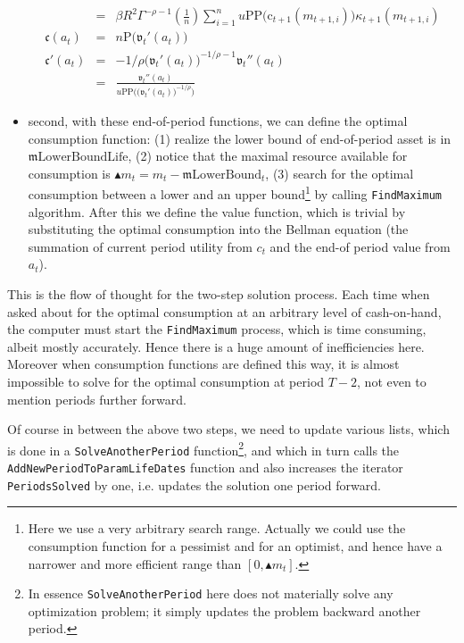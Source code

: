 \documentclass[titlepage,abstract]{\econtex}
\providecommand{\mEndLowerBoundLife}{\ensuremath{\mathfrak{m}}\text{LowerBoundLife}}
\providecommand{\mEndLowerBound}{\ensuremath{\mathfrak{m}}\text{LowerBound}}
\begin{document}
\begin{itemize}
\begin{eqnarray}
            &=& \beta R^{2} \Gamma^{-\rho-1} \left(\frac{1}{n}\right)\sum_{i=1}^{n}
              u\text{PP}\big(\ensuremath{\mathrm{c}}_{t+1}(m_{t+1, i})\big) \ensuremath{\kappa}_{t+1}(m_{t+1, i}) \\
              \ensuremath{\mathfrak{c}}(a_{t}) &=& n\text{P}\big(\ensuremath{\mathfrak{v}}_{t}'(a_{t})\big) \\
              \ensuremath{\mathfrak{c}}'(a_{t}) &=&-1/\rho \big(\ensuremath{\mathfrak{v}}_{t}'(a_{t})\big)^{-1/\rho-1} \ensuremath{\mathfrak{v}}_{t}''(a_{t}) \\
              &=& \frac{\ensuremath{\mathfrak{v}}_{t}''(a_{t})}{u\text{PP}\Big(\big(\ensuremath{\mathfrak{v}}_{t}'(a_{t})\big)^{-1/\rho}\Big)}
            \end{eqnarray}
      \item second, with these end-of-period functions, we can define the optimal consumption function: (1) realize the lower bound of end-of-period asset is in $\mEndLowerBoundLife$, (2) notice that the maximal resource available for consumption is $\blacktriangle m_{t}=m_{t}- \mEndLowerBound_{t}$, (3) search for the optimal consumption between a lower and an upper bound\footnote{Here we use a very arbitrary search range. Actually we could use the consumption function for a pessimist and for an optimist, and hence have a narrower and more efficient range than $[0, \blacktriangle m_{t}]$.} by calling \texttt{FindMaximum} algorithm. After this we define the value function, which is trivial by substituting the optimal consumption into the Bellman equation (the summation of current period utility from $c_{t}$ and the end-of period value from $a_{t}$).
\end{itemize}

This is the flow of thought for the two-step solution process. Each time when asked about for the optimal consumption at an arbitrary level of cash-on-hand, the computer must start the \texttt{FindMaximum} process, which is time consuming, albeit mostly accurately. Hence there is a huge amount of inefficiencies here. Moreover when consumption functions are defined this way, it is almost impossible to solve for the optimal consumption at period $T-2$, not even to mention periods further forward.

Of course in between the above two steps, we need to update various lists, which is done in a \texttt{SolveAnotherPeriod} function\footnote{In essence \texttt{SolveAnotherPeriod} here does not materially solve any optimization problem; it simply updates the problem backward another period.}, and which in turn calls the \texttt{AddNewPeriodToParamLifeDates} function and also increases the iterator \texttt{PeriodsSolved} by one, i.e. updates the solution one period forward.
\end{document}
